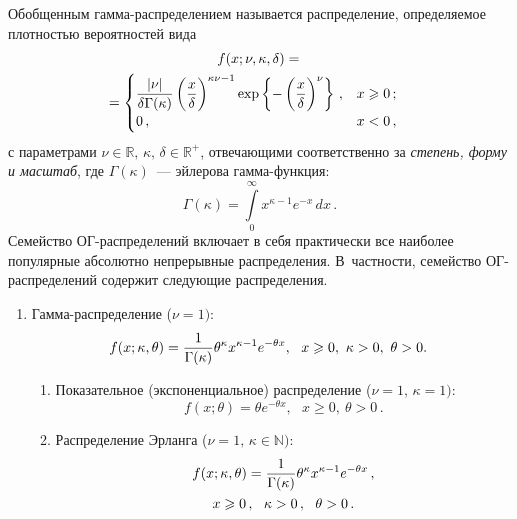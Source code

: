 \begin{multicols}{2}
Обобщенным гам\-ма-рас\-пре\-де\-ле\-ни\-ем называется распределение,
определяемое плотностью вероятностей вида
\begin{multline}
f(x;\nu,\kappa,\delta)={}\\
\hspace*{-5mm}{}=
\begin{cases}
\fr{|\nu|}{\delta\Gamma(\kappa)}\left(\fr{x}{\delta}\right)^{\kappa\nu-1}\exp
\left\{-\left(\fr{x}{\delta}\right)^{\nu}\right\}\,,
& x\geqslant0\,;\\
0\,, & x<0\,,
\end{cases}\!
\label{e16-1-kor}
\end{multline}
с параметрами $\nu\in\mathbb{R},\,\kappa,\,\delta\in{\mathbb R}^+$,
отвечающими соответственно за {\it степень, форму и масштаб}, где
$\Gamma(\kappa)$~--- эйлерова гам\-ма-функ\-ция:
$$
\Gamma(\kappa)=\int\limits_{0}^{\infty}x^{\kappa-1}e^{-x}\,dx\,.
$$
 Семейство ОГ-рас\-пре\-де\-ле\-ний включает в
себя практически все наиболее популярные абсолютно непрерывные
распределения. В~частности, семейство ОГ-рас\-пре\-де\-ле\-ний содержит
следующие распределения.
\begin{enumerate}[1.]
\item Гамма-распределение ($\nu=1)$:
$$
\hspace*{-5.31412pt}f(x;\kappa,\theta)=\displaystyle\frac{\displaystyle 1\mathstrut}{\displaystyle \Gamma(\kappa)\mathstrut}\theta^{\kappa}x^{\kappa-1}e^{-\theta
x},\ \  x\geqslant0,\ \kappa>0,\ \theta>0.
$$
\begin{enumerate}[{1.}1.]
\item Показательное (экспоненциальное) распределение ($\nu=1,\, \kappa=1)$:
$$%
f(x;\theta)=\theta e^{-\theta x},\ \ \ x\geqslant0,\ \theta>0\,.
$$
\item Распределение Эрланга ($\nu=1,\, \kappa\in\mathbb{N})$:
\begin{multline*}
f(x;\kappa,\theta)=\displaystyle\frac{\displaystyle 1\mathstrut}{\displaystyle \Gamma(\kappa)\mathstrut}\theta^{\kappa}x^{\kappa-1}e^{-\theta
x}\,,\\
 x\geqslant0\,,\ \ \kappa>0\,,\ \ \theta>0\,.
\end{multline*}


\end{enumerate}
\end{enumerate}
\end{multicols}
